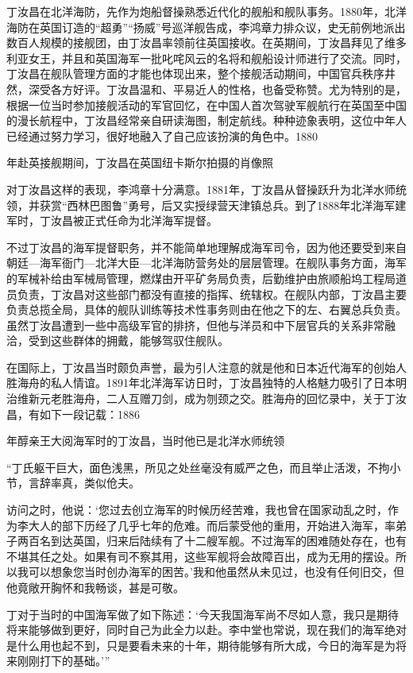 \documentclass[12pt,UTF8]{ctexbook}
\begin{document}
丁汝昌在北洋海防，先作为炮船督操熟悉近代化的舰船和舰队事务。1880年，北洋海防在英国订造的“超勇”“扬威”号巡洋舰告成，李鸿章力排众议，史无前例地派出数百人规模的接舰团，由丁汝昌率领前往英国接收。在英期间，丁汝昌拜见了维多利亚女王，并且和英国海军一批叱咤风云的名将和舰船设计师进行了交流。同时，丁汝昌在舰队管理方面的才能也体现出来，整个接舰活动期间，中国官兵秩序井然，深受各方好评。丁汝昌温和、平易近人的性格，也备受称赞。尤为特别的是，根据一位当时参加接舰活动的军官回忆，在中国人首次驾驶军舰航行在英国至中国的漫长航程中，丁汝昌经常亲自研读海图，制定航线。种种迹象表明，这位中年人已经通过努力学习，很好地融入了自己应该扮演的角色中。1880


年赴英接舰期间，丁汝昌在英国纽卡斯尔拍摄的肖像照

对丁汝昌这样的表现，李鸿章十分满意。1881年，丁汝昌从督操跃升为北洋水师统领，并获赏“西林巴图鲁”勇号，后又实授绿营天津镇总兵。到了1888年北洋海军建军时，丁汝昌被正式任命为北洋海军提督。

不过丁汝昌的海军提督职务，并不能简单地理解成海军司令，因为他还要受到来自朝廷—海军衙门—北洋大臣—北洋海防营务处的层层管理。在舰队事务方面，海军的军械补给由军械局管理，燃煤由开平矿务局负责，后勤维护由旅顺船坞工程局道员负责，丁汝昌对这些部门都没有直接的指挥、统辖权。在舰队内部，丁汝昌主要负责总揽全局，具体的舰队训练等技术性事务则由在他之下的左、右翼总兵负责。虽然丁汝昌遭到一些中高级军官的排挤，但他与洋员和中下层官兵的关系非常融洽，受到这些群体的拥戴，能够驾驭住舰队。

在国际上，丁汝昌当时颇负声誉，最为引人注意的就是他和日本近代海军的创始人胜海舟的私人情谊。1891年北洋海军访日时，丁汝昌独特的人格魅力吸引了日本明治维新元老胜海舟，二人互赠刀剑，成为刎颈之交。胜海舟的回忆录中，关于丁汝昌，有如下一段记载：1886


年醇亲王大阅海军时的丁汝昌，当时他已是北洋水师统领

“丁氏躯干巨大，面色浅黑，所见之处丝毫没有威严之色，而且举止活泼，不拘小节，言辞率真，类似伧夫。

访问之时，他说：‘您过去创立海军的时候历经苦难，我也曾在国家动乱之时，作为李大人的部下历经了几乎七年的危难。而后蒙受他的重用，开始进入海军，率弟子两百名到达英国，归来后陆续有了十二艘军舰。不过海军的困难随处存在，也有不堪其任之处。如果有司不察其用，这些军舰将会故障百出，成为无用的摆设。所以我可以想象您当时创办海军的困苦。’我和他虽然从未见过，也没有任何旧交，但他竟敞开胸怀和我畅谈，甚是可敬。

丁对于当时的中国海军做了如下陈述：‘今天我国海军尚不尽如人意，我只是期待将来能够做到更好，同时自己为此全力以赴。李中堂也常说，现在我们的海军绝对是什么用也起不到，只是要看未来的十年，期待能够有所大成，今日的海军是为将来刚刚打下的基础。’”
\end{document}
